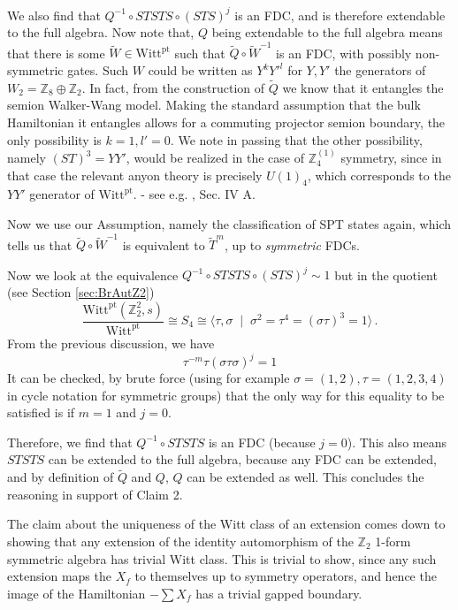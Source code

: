 \documentclass[aps,twocolumn,prx,floatfix,preprintnumbers, nofootinbib,10pt]{revtex4-2}
\numberwithin{equation}{section}
\theoremstyle{definition}
\theoremstyle{remark}
\theoremstyle{claim}
\newcommand{\Perm}{S}
\newcommand{\be}{\begin{equation}}
\newcommand{\ee}{\end{equation}}
\newcommand{\Z}{{\mathbb Z}}
\newcommand{\Witt}{\text{Witt}}
\newcommand{\pt}{\text{pt}}
\begin{document}
We also find that $Q^{-1} \circ STSTS \circ (STS)^{j}$ is an FDC, and is therefore extendable to the full algebra. Now note that, $Q$ being extendable to the full algebra means that there is some $\tilde{W} \in \Witt^\pt$ such that $\tilde{Q} \circ \tilde{W}^{-1}$ is an FDC, {with possibly non-symmetric gates}. Such $W$ could be written as $Y^k Y'^l$ for $Y, Y'$ the generators of $W_2 = \Z_8 \oplus \Z_2$. {In fact, from the construction of $\tilde{Q}$ we know that it entangles the semion Walker-Wang model.  Making the standard assumption that the bulk Hamiltonian it entangles allows for a commuting projector semion boundary, the only possibility is $k=1, l'=0$.  We note in passing that the other possibility, namely $(ST)^3 = Y Y'$, would be realized in the case of $\Z_4^{(1)}$ symmetry, since in that case the relevant anyon theory is precisely $U(1)_4$, which corresponds to the $Y Y'$ generator of $\Witt^\pt$.} - see e.g. \cite{Shirley_2022}, Sec. IV A. 

Now we use our Assumption, namely the classification of SPT states again, which tells us that $\tilde{Q} \circ \tilde{W}^{-1}$ is equivalent to $\tilde{T}^m$, up to \emph{symmetric} FDCs.

Now we look at the equivalence $Q^{-1} \circ STSTS \circ (STS)^{j} \sim 1$ but in the quotient (see Section \ref{sec:BrAutZ2})
\be
\frac{\Witt^\pt(\Z_2^2, s)}{\Witt^\pt} \cong \Perm_4 \cong \langle \tau, \sigma \; \mid \; \sigma^2 = \tau^4 = (\sigma \tau)^3 = 1 \rangle \,.
\ee
From the previous discussion, we have
\be
\tau^{-m} \tau (\sigma \tau \sigma)^j = 1
\ee
It can be checked, by brute force (using for example $\sigma = (1, 2), \tau = (1, 2, 3, 4)$ in cycle notation for symmetric groups) that the only way for this equality to be satisfied is if $m = 1$ and $j = 0$.

Therefore, we find that $Q^{-1} \circ STSTS$ is an FDC (because $j = 0$). This also means $STSTS$ can be extended to the full algebra, because any FDC can be extended, and by definition of $\tilde{Q}$ and $Q$, $Q$ can be extended as well. This concludes the reasoning in support of Claim 2.

The claim about the uniqueness of the Witt class of an extension comes down to showing that any extension of the identity automorphism of the $\Z_2$ 1-form symmetric algebra has trivial Witt class.  This is trivial to show, since any such extension maps the $X_f$ to themselves up to symmetry operators, and hence the image of the Hamiltonian $-\sum X_f$ has a trivial gapped boundary.
\end{document}
